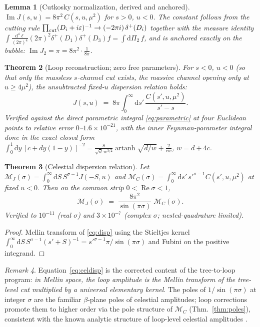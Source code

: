 \documentclass[12pt,a4paper]{article}
\theoremstyle{plain}
\newtheorem{theorem}{Theorem}[section]
\newtheorem{lemma}[theorem]{Lemma}
\theoremstyle{definition}
\theoremstyle{remark}
\newtheorem{remark}[theorem]{Remark}
\newcommand{\dd}{\mathrm{d}}
\newcommand{\cM}{\mathcal{M}}
\newcommand{\dLIPS}{\dd\Pi_2}
\begin{document}
\begin{lemma}[Cutkosky normalization, derived and anchored]
\label{lem:cutkosky}
$\operatorname{Im}J(s,u)=8\pi^2\,C(s,u,\mu^2)$ for $s>0$, $u<0$.  The
constant follows from the cutting rule
$\prod_{\rm cut}(D_i+i\varepsilon)^{-1}\to(-2\pi i)\,\delta^+(D_i)$
together with the measure identity
$\int\frac{\dd^4\ell}{(2\pi)^4}(2\pi)^2\delta^+(D_1)\delta^+(D_3)f
=\int\dLIPS\,f$, and is anchored \emph{exactly} on the bubble:
$\operatorname{Im}J_2=\pi=8\pi^2\cdot\tfrac{1}{8\pi}$.
\end{lemma}

\begin{theorem}[Loop reconstruction; zero free parameters]
\label{thm:disp}
For $s<0$, $u<0$ (so that only the massless $s$-channel cut exists, the
massive channel opening only at $u\ge 4\mu^2$), the unsubtracted
fixed-$u$ dispersion relation holds:
\begin{equation}
J(s,u)\;=\;8\pi\int_0^{\infty}\!\dd s'\,
\frac{C(s',u,\mu^2)}{s'-s}.
\label{eq:disp}
\end{equation}
Verified against the direct parametric integral
\eqref{eq:parametric} at four Euclidean points to relative error
$0$--$1.6\times10^{-21}$, with the inner Feynman-parameter integral
done in the exact closed form
$\int_0^1\dd y\,[c+dy(1-y)]^{-2}
=\tfrac{8}{\sqrt d\,w^{3/2}}\operatorname{artanh}\sqrt{d/w}
+\tfrac{2}{cw}$, $w=d+4c$.
\end{theorem}

\begin{theorem}[Celestial dispersion relation]
\label{thm:celdisp}
Let $\cM_J(\sigma)=\int_0^\infty\dd S\,S^{\sigma-1}J(-S,u)$ and
$\cM_C(\sigma)=\int_0^\infty\dd s'\,s'^{\sigma-1}C(s',u,\mu^2)$ at
fixed $u<0$.  Then on the common strip $0<\operatorname{Re}\sigma<1$,
\begin{equation}
\boxed{\;\;
\cM_J(\sigma)\;=\;\frac{8\pi^2}{\sin(\pi\sigma)}\;\cM_C(\sigma).
\;\;}
\label{eq:celdisp}
\end{equation}
Verified to $10^{-11}$ (real $\sigma$) and $3\times10^{-7}$
(complex $\sigma$; nested-quadrature limited).
\end{theorem}

\begin{proof}
Mellin transform of \eqref{eq:disp} using the Stieltjes kernel
$\int_0^\infty\dd S\,S^{\sigma-1}(s'+S)^{-1}
=s'^{\sigma-1}\pi/\sin(\pi\sigma)$ and Fubini on the positive
integrand.
\end{proof}

\begin{remark}
Equation~\eqref{eq:celdisp} is the corrected content of the tree-to-loop
program: \emph{in Mellin space, the loop amplitude is the Mellin
transform of the tree-level cut multiplied by a universal elementary
kernel}.  The poles of $1/\sin(\pi\sigma)$ at integer $\sigma$ are the
familiar $\beta$-plane poles of celestial amplitudes; loop corrections
promote them to higher order via the pole structure of $\cM_C$
(Thm.~\ref{thm:poles}), consistent with the known analytic structure of
loop-level celestial amplitudes \cite{AHH2020,Chang2021}.
\end{remark}
\end{document}
